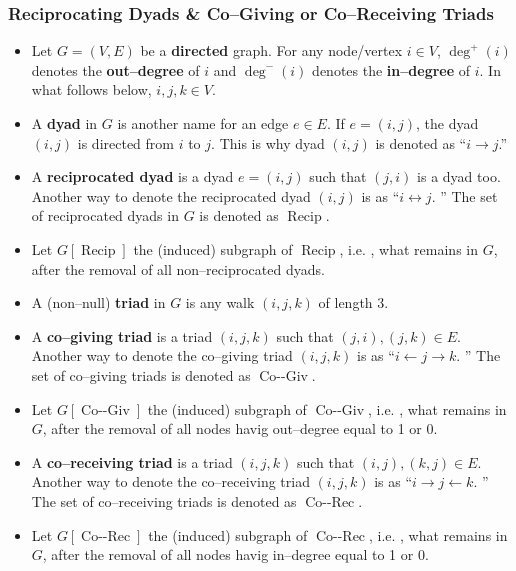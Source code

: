 \documentclass{beamer}
\DeclareMathOperator{\degr}{deg}
\DeclareMathOperator{\rec}{Recip}
\DeclareMathOperator{\cog}{Co--Giv}
\DeclareMathOperator{\cor}{Co--Rec}
\begin{document}
\begin{frame}
\frametitle{Reciprocating Dyads \& Co--Giving or Co--Receiving Triads}
\vspace{-0.2cm}
\scriptsize
\begin{itemize}
\item Let \alert{$G = (V,E)$} be a \alert{{\bf{directed}} graph}.  For any node/vertex $i \in V$,  \alert{$\degr^{+}(i)$} denotes the \alert{{\bf{out--degree}}} of $i$ and \alert{$\degr^{-}(i)$} denotes the \alert{{\bf{in--degree}}} of $i$. In what follows below, $i, j, k \in V$.
\item A \alert{{\bf{dyad}}} in $G$ is another name for an edge $e \in E$.  If $e=(i,j)$,  the dyad $(i,j)$ is directed from $i$ to $j$.  This is why dyad $(i,j)$ is denoted as ``$i \rightarrow j$.\!''
\item A \alert{{\bf{reciprocated dyad}}} is a dyad $e=(i,j)$ such that $(j,i)$ is a dyad too.  Another way to denote the reciprocated dyad $(i,j)$ is as ``\alert{$i \leftrightarrow j$. \!\!\!}'' The set of reciprocated dyads in $G$ is denoted as \alert{$\rec$}.  %
\item Let \alert{$G[\rec]$} the (induced) \alert{subgraph of $\rec$, } i.e. \!\!\!,  what remains in $G$,  after the removal of all non--reciprocated dyads.
\item A (non--null) \alert{{\bf{triad}}} in $G$ is any walk $(i,j,k)$ of length 3.
\item A \alert{{\bf{co--giving triad}}} is a triad $(i,j,k)$ such that $(j,i),  (j,k) \in E$.  Another way to denote the co--giving triad $(i,j,k)$ is as ``\alert{$i \leftarrow j \rightarrow k$. \!\!\!}'' The set of co--giving triads is denoted as \alert{$\cog$}. %
\item Let \alert{$G[\cog]$} the (induced) \alert{subgraph of $\cog$, } i.e. \!\!\!,  what remains in $G$,  after the removal of all nodes havig out--degree equal to 1 or 0.
\item A \alert{{\bf{co--receiving triad}}} is a triad $(i,j,k)$ such that $(i,j),  (k,j) \in E$.  Another way to denote the co--receiving triad $(i,j,k)$ is as ``\alert{$i \rightarrow j \leftarrow k$. \!\!\!}''  The set of co--receiving triads is denoted as \alert{$\cor$}. %
\item Let \alert{$G[\cor]$} the (induced) \alert{subgraph of $\cor$, } i.e. \!\!\!,  what remains in $G$,  after the removal of all nodes havig in--degree equal to 1 or 0.
\end{itemize}
\end{frame}
\end{document}
